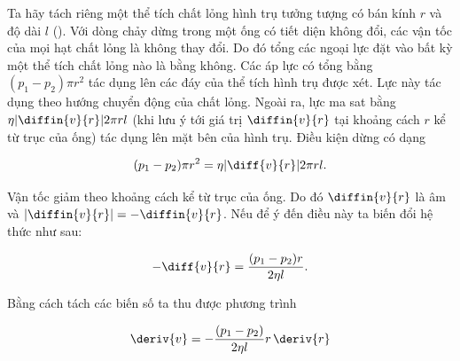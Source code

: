 
Ta hãy tách riêng một thể tích chất lỏng hình trụ tưởng tượng có bán kính $r$ và độ dài $l$ (). Với dòng chảy dừng trong một ống có tiết diện không đổi, các vận tốc của mọi hạt chất lỏng là không thay đổi. Do đó tổng các ngoại lực đặt vào bất kỳ một thể tích chất lỏng nào là bằng không. Các áp lực có tổng bằng $(p_1-p_2)\pi r^2$ tác dụng lên các đáy của thể tích hình trụ được xét.  Lực này tác dụng theo hướng chuyển động của chất lỏng. Ngoài ra, lực ma sat bằng $\eta|\diffin{v}{r}|2\pi rl$ (khi lưu ý tới giá trị $\diffin{v}{r}$ tại khoảng cách $r$ kể từ trục của ống) tác dụng lên mặt bên của hình trụ. Điều kiện dừng có dạng

\begin{equation}\label{eq:9_16}
	(p_1 - p_2)\pi r^2 = \eta|\diff{v}{r}|2\pi rl.
\end{equation}


Vận tốc giảm theo khoảng cách kể từ trục của ống. Do đó $\diffin{v}{r}$ là âm và $|\diffin{v}{r}|=-\diffin{v}{r}$. Nếu để ý đến điều này ta biến đổi hệ thức  như sau:

\begin{equation*}
	- \diff{v}{r} = \frac{(p_1 - p_2)r}{2\eta l}.
\end{equation*}
\noindent

Bằng cách tách các biến số ta thu được phương trình

\begin{equation*}
	\deriv{v} = -\frac{(p_1 - p_2)}{2\eta l}r\,\deriv{r}
\end{equation*}
\noindent


